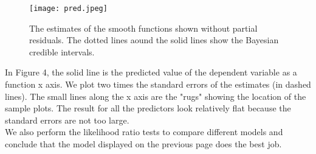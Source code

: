 \documentclass[10pt]{article}
\begin{document}
\begin{itemize}
\begin{figure}[h]

\centering
\texttt{[image: pred.jpeg]} 
\caption{The estimates of the smooth functions shown without partial residuals. The dotted lines aound the solid lines show the Bayesian credible intervals.} 
\end{figure} 
In Figure 4, the solid line is the predicted value of the dependent variable as a function x axis. We plot two times the standard errors of the estimates (in dashed lines). The small lines along the x axis are the "rugs" showing the location of the sample plots. The result for all the predictors look relatively flat because the standard errors are not too large. \\ 
We also perform the likelihood ratio tests to compare different models and conclude that the model displayed on the previous page does the best job. 













%
%
%
%
%



\end{itemize}
\end{document}
